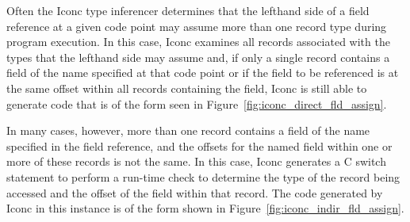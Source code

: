 Often the Iconc type inferencer determines that the lefthand side of a
field reference at a given code point may assume more than one record
type during program execution.  In this case, Iconc examines all
records associated with the types that the lefthand side may assume
and, if only a single record contains a field of the name specified at
that code point or if the field to be referenced is at the same offset
within all records containing the field, Iconc is still able to
generate code that is of the form seen in
Figure~\ref{fig:iconc_direct_fld_assign}.

In many cases, however, more than one record contains a field of the
name specified in the field reference, and the offsets for the named
field within one or more of these records is not the same.  In this
case, Iconc generates a C switch statement to perform a
\mbox{run-time} check to determine the type of the record being
accessed and the offset of the field within that record.  The code
generated by Iconc in this instance is of the form shown in
Figure~\ref{fig:iconc_indir_fld_assign}.

